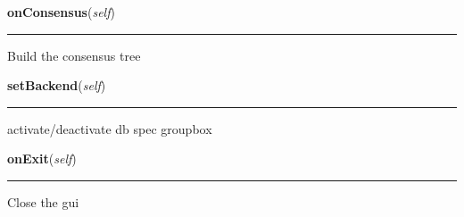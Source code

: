     \label{epigrass:MainPanel_Impl:onConsensus}

    \vspace{0.5ex}

    \begin{boxedminipage}{\textwidth}

    \raggedright \textbf{onConsensus}(\textit{self})

    \vspace{-1.5ex}

    \rule{\textwidth}{0.5\fboxrule}
    Build the consensus tree

    \vspace{1ex}

    \end{boxedminipage}

    \label{epigrass:MainPanel_Impl:setBackend}

    \vspace{0.5ex}

    \begin{boxedminipage}{\textwidth}

    \raggedright \textbf{setBackend}(\textit{self})

    \vspace{-1.5ex}

    \rule{\textwidth}{0.5\fboxrule}
    activate/deactivate db spec groupbox

    \vspace{1ex}

    \end{boxedminipage}

    \label{epigrass:MainPanel_Impl:onExit}

    \vspace{0.5ex}

    \begin{boxedminipage}{\textwidth}

    \raggedright \textbf{onExit}(\textit{self})

    \vspace{-1.5ex}

    \rule{\textwidth}{0.5\fboxrule}
    Close the gui

    \vspace{1ex}

    \end{boxedminipage}

